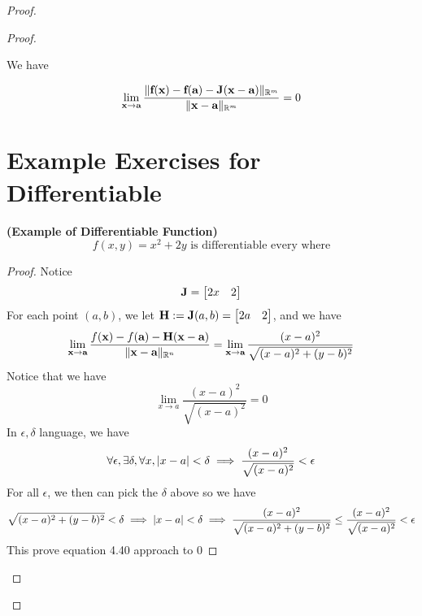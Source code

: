 \documentclass{report}
\begin{document}
\begin{proof}
\begin{proof}
\begin{theorem}
We have

\begin{equation}
\lim_{\textbf{x}\to \textbf{a}}\frac{\| \textbf{f}(\textbf{x})-\textbf{f}(\textbf{a})-\textbf{J}(\textbf{x}-\textbf{a}) \|_{\mathbb{R}^m}}{\| \textbf{x}-\textbf{a} \|_{\mathbb{R}^m}}=0
\end{equation}
\end{theorem}
\section{Example Exercises for Differentiable}
\begin{theorem}
\label{5.3.1}
\textbf{(Example of Differentiable Function)} 
\begin{equation}
f(x,y)=x^2+2y\text{ is differentiable every where}
\end{equation}
\end{theorem}
\begin{proof}
Notice 
\begin{equation}
\textbf{J}=\begin{bmatrix}
  2x&2
\end{bmatrix}
\end{equation}
For each point $(a,b)$, we let $\textbf{H}:=\textbf{J}(a,b)=\begin{bmatrix}
  2a&2
\end{bmatrix}$, and we have
\begin{equation}
\lim_{\textbf{x}\to \textbf{a}}\frac{f(\textbf{x})-f(\textbf{a})-\textbf{H}(\textbf{x}-\textbf{a})}{\| \textbf{x}-\textbf{a} \|_{\mathbb{R}^n}}=\lim_{\textbf{x}\to \textbf{a}}\frac{(x-a)^2}{\sqrt{(x-a)^2+(y-b)^2}}
\end{equation}
Notice that we have
\begin{equation}
\lim_{x\to a}\frac{(x-a)^2}{\sqrt{(x-a)^2} }=0
\end{equation}
In $\epsilon,\delta$ language, we have
\begin{equation}
\forall \epsilon,\exists \delta, \forall x, |x-a|<\delta \implies \frac{(x-a)^2}{\sqrt{(x-a)^2} }<\epsilon  
\end{equation}
For all $\epsilon $, we then can pick the $\delta$ above so we have
\begin{equation}
\sqrt{(x-a)^2+(y-b)^2}<\delta \implies |x-a|<\delta\implies \frac{(x-a)^2}{\sqrt{(x-a)^2+(y-b)^2} }\leq  \frac{(x-a)^2}{\sqrt{(x-a)^2} } <\epsilon 
\end{equation}
This prove equation 4.40 approach to 0
\end{proof}
\begin{theorem}

\end{theorem}
\end{proof}
\end{proof}
\end{document}
